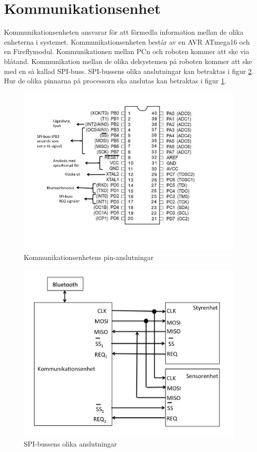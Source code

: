 \section{Kommunikationsenhet}
Kommunikationsenheten ansvarar för att förmedla information mellan de olika enheterna i systemet. Kommunikationsenheten består av en AVR ATmega16 och en Fireflymodul. 
Kommunikationen mellan PCn och roboten kommer att ske via blåtand. Kommunikation mellan de olika delsystemen på roboten kommer att ske med en så kallad SPI-buss. SPI-bussens olika anslutningar kan betraktas i figur \ref{fig:spibuss}. Hur de olika pinnarna på processorn ska anslutas kan betraktas i figur \ref{fig:PINkomm}.

\begin{figure}[H]
  \centering
 \includegraphics[angle=0,scale=0.5]{bilder/PIN_komm.jpg}
  \caption{Kommunikationsenhetens pin-anslutningar}
  \label{fig:PINkomm}
\end{figure}


\begin{figure}[H]
  \centering
 \includegraphics[angle=0,scale=0.5]{bilder/SPI-buss.png}
  \caption{SPI-bussens olika anslutningar}
  \label{fig:spibuss}
\end{figure}


